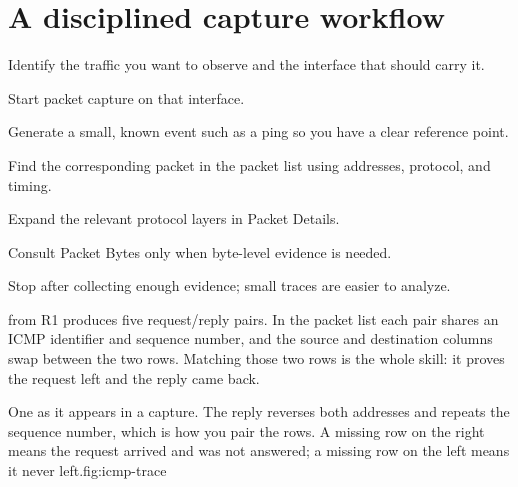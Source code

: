 \section{A disciplined capture workflow}
\begin{utpsteps}
\item Identify the traffic you want to observe and the interface that should carry it.
\item Start packet capture on that interface.
\item Generate a small, known event such as a ping so you have a clear reference point.
\item Find the corresponding packet in the packet list using addresses, protocol, and timing.
\item Expand the relevant protocol layers in Packet Details.
\item Consult Packet Bytes only when byte-level evidence is needed.
\item Stop after collecting enough evidence; small traces are easier to analyze.
\end{utpsteps}

\begin{workedexample}
 from R1 produces five request/reply pairs. In the
packet list each pair shares an ICMP identifier and sequence number, and
the source and destination columns swap between the two rows. Matching
those two rows is the whole skill: it proves the request left and the
reply came back.
\end{workedexample}

\begin{utpfig}{One  as it appears in a capture.
The reply reverses both addresses and repeats the sequence number, which is how
you pair the rows. A missing row on the right means the request arrived and was
not answered; a missing row on the left means it never left.}{fig:icmp-trace}
\end{utpfig}

